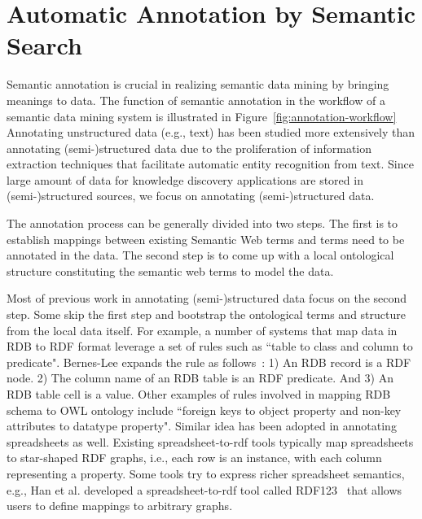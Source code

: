 \section{Automatic Annotation by Semantic Search}
Semantic annotation is crucial in realizing semantic data mining by bringing meanings to data. The function of semantic annotation in the workflow of a semantic data mining system is illustrated in Figure~\ref{fig:annotation-workflow} Annotating unstructured data (e.g., text) has been studied more extensively than annotating (semi-)structured data due to the proliferation of information extraction techniques that facilitate automatic entity recognition from text. Since large amount of data for knowledge discovery applications are stored in (semi-)structured sources, we focus on annotating (semi-)structured data.

The annotation process can be generally divided into two steps. The first is to establish mappings between existing Semantic Web terms and terms need to be annotated in the data. The second step is to come up with a local ontological structure constituting the semantic web terms to model the data.

Most of previous work in annotating (semi-)structured data focus on the second step. Some skip the first step and bootstrap the ontological terms and structure from the local data itself. For example, a number of systems that map data in RDB to RDF format leverage a set of rules such as ``table to class and column to predicate". Bernes-Lee expands the rule as follows~\cite{TBL98}: 1) An RDB record is a RDF node. 2) The column name of an RDB table is an RDF predicate. And 3) An RDB table cell is a value. Other examples of rules involved in mapping RDB schema to OWL ontology include ``foreign keys to object property and non-key attributes to datatype property".
Similar idea has been adopted in annotating spreadsheets as well. Existing spreadsheet-to-rdf tools typically map spreadsheets to star-shaped RDF graphs, i.e., each row is an instance, with each column representing a property. Some tools try to express richer spreadsheet semantics, e.g., Han et al. developed a spreadsheet-to-rdf tool called RDF123~\cite{RDF123} that allows users to define mappings to arbitrary graphs.

